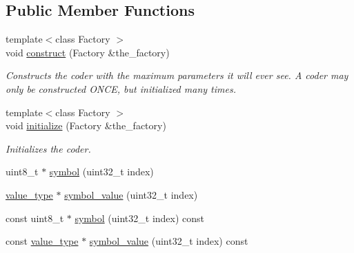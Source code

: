 \subsection*{Public Member Functions}
\begin{DoxyCompactItemize}
\item 
{\footnotesize template$<$class Factory $>$ }\\void \hyperlink{classkodo_1_1deep__symbol__storage_a372732fca9b67df9cc718d67db933687}{construct} (Factory \&the\-\_\-factory)
\begin{DoxyCompactList}\small\item\em Constructs the coder with the maximum parameters it will ever see. A coder may only be constructed O\-N\-C\-E, but initialized many times. \end{DoxyCompactList}\item 
{\footnotesize template$<$class Factory $>$ }\\void \hyperlink{classkodo_1_1deep__symbol__storage_a9621739e5efd28d5c3dce6cdc588e892}{initialize} (Factory \&the\-\_\-factory)
\begin{DoxyCompactList}\small\item\em Initializes the coder. \end{DoxyCompactList}\item 
uint8\-\_\-t $\ast$ \hyperlink{classkodo_1_1deep__symbol__storage_a9dcd4cad9f836987d0bd53b4bac99984}{symbol} (uint32\-\_\-t index)
\begin{DoxyCompactList}\small\item\em \end{DoxyCompactList}\item 
\hyperlink{classkodo_1_1deep__symbol__storage_ab362e1273dc5cd41dceca6e3ea9199c2}{value\-\_\-type} $\ast$ \hyperlink{classkodo_1_1deep__symbol__storage_a8fcef2699440746a9b974656e226b71f}{symbol\-\_\-value} (uint32\-\_\-t index)
\begin{DoxyCompactList}\small\item\em \end{DoxyCompactList}\item 
const uint8\-\_\-t $\ast$ \hyperlink{classkodo_1_1deep__symbol__storage_a92d6a4620bc934a80418cedb85eb9710}{symbol} (uint32\-\_\-t index) const 
\begin{DoxyCompactList}\small\item\em \end{DoxyCompactList}\item 
const \hyperlink{classkodo_1_1deep__symbol__storage_ab362e1273dc5cd41dceca6e3ea9199c2}{value\-\_\-type} $\ast$ \hyperlink{classkodo_1_1deep__symbol__storage_ae2552deee55be9ce831196ecc3c48133}{symbol\-\_\-value} (uint32\-\_\-t index) const 

\end{DoxyCompactItemize}
